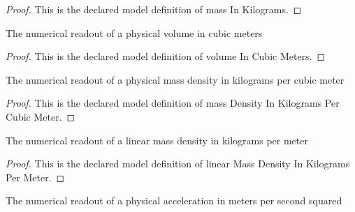 \begin{proof}
  This is the declared model definition of mass In Kilograms.
\end{proof}
\begin{definition}
  \label{def:physics:phyx-mini-0167:phyxminiproblems-problemphyxmini0167-volumeincubicmeters}
  The numerical readout of a physical volume in cubic meters
\end{definition}
\begin{proof}
  This is the declared model definition of volume In Cubic Meters.
\end{proof}
\begin{definition}
  \label{def:physics:phyx-mini-0167:phyxminiproblems-problemphyxmini0167-massdensityinkilogramspercubicmeter}
  The numerical readout of a physical mass density in kilograms per cubic meter
\end{definition}
\begin{proof}
  This is the declared model definition of mass Density In Kilograms Per Cubic Meter.
\end{proof}
\begin{definition}
  \label{def:physics:phyx-mini-0167:phyxminiproblems-problemphyxmini0167-linearmassdensityinkilogramspermeter}
  The numerical readout of a linear mass density in kilograms per meter
\end{definition}
\begin{proof}
  This is the declared model definition of linear Mass Density In Kilograms Per Meter.
\end{proof}
\begin{definition}
  \label{def:physics:phyx-mini-0167:phyxminiproblems-problemphyxmini0167-accelerationinmeterspersecondsquared}
  The numerical readout of a physical acceleration in meters per second squared
\end{definition}
